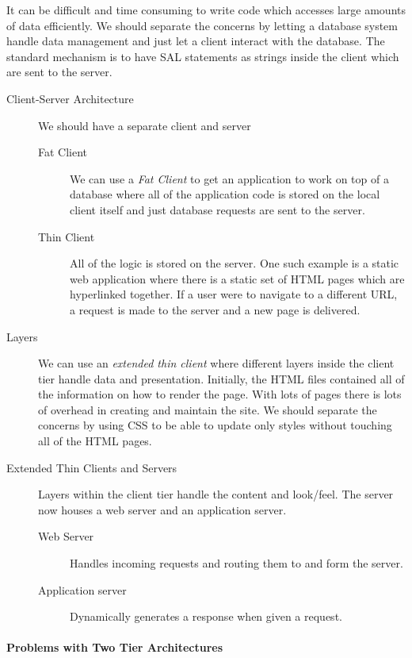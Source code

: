 It can be difficult and time consuming to write code which accesses large amounts of data efficiently.
We should separate the concerns by letting a database system handle data management and just let a client interact with the database.
The standard mechanism is to have SAL statements as strings inside the client which are sent to the server.

\begin{description}
	\item[Client-Server Architecture] We should have a separate client and server
		\begin{description}
			\item[Fat Client] We can use a \emph{Fat Client} to get an application to work on top of a database where all of the application code is stored on the local client itself and just database requests are sent to the server.
			\item[Thin Client] All of the logic is stored on the server.
				One such example is a static web application where there is a static set of HTML pages which are hyperlinked together.
				If a user were to navigate to a different URL, a request is made to the server and a new page is delivered.
		\end{description}
	\item[Layers] We can use an \emph{extended thin client} where different layers inside the client tier handle data and presentation.
		Initially, the HTML files contained all of the information on how to render the page.
		With lots of pages there is lots of overhead in creating and maintain the site.
		We should separate the concerns by using CSS to be able to update only styles without touching all of the HTML pages.
	\item[Extended Thin Clients and Servers] Layers within the client tier handle the content and look/feel.
		The server now houses a web server and an application server.
		\begin{description}
			\item[Web Server] Handles incoming requests and routing them to and form the server.
			\item[Application server] Dynamically generates a response when given a request.
		\end{description}
\end{description}

\paragraph{Problems with Two Tier Architectures}\label{par:problems_with_two_tier_architectures}

